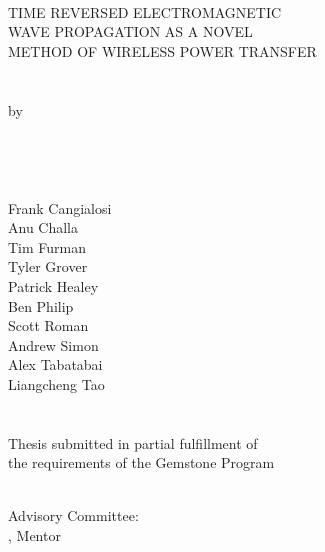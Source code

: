 \hbox{\ }
\vspace{0.5in}
\startSINGLEspacing
\begin{center}

\large{{TIME REVERSED ELECTROMAGNETIC\\
        WAVE PROPAGATION AS A NOVEL \\
        METHOD OF WIRELESS POWER TRANSFER}}\\
\ \\
\ \\
\large{by} \\
\ \\
\large{\teamname}
\ \\
\ \\
\ \\
\small\normalsize
Frank Cangialosi\\
Anu Challa\\
Tim Furman\\
Tyler Grover\\
Patrick Healey\\
Ben Philip\\
Scott Roman\\
Andrew Simon\\
Alex Tabatabai\\
Liangcheng Tao\\
\ \\ 
\ \\
Thesis submitted in partial fulfillment of \\ 
the requirements of the Gemstone Program\\
\Umd \\
\the\year
\end{center}

\vspace{5.5em}

\noindent Advisory Committee: \\
\mentor, Mentor \\
\discussantsEACHLINE
